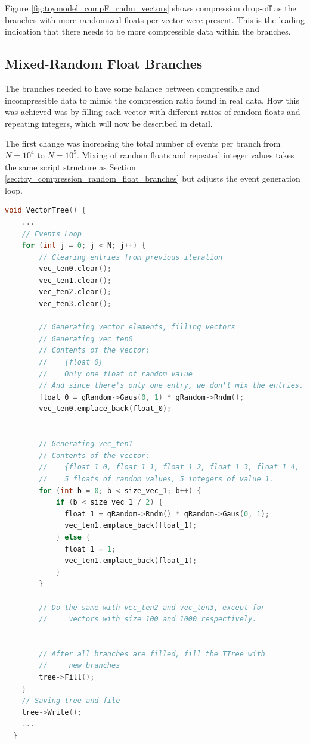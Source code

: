 Figure \ref{fig:toymodel_compF_rndm_vectors} shows compression drop-off as the branches with more randomized floats per vector were present.
This is the leading indication that there needs to be more compressible data within the branches. 

\subsection{Mixed-Random Float Branches}
The branches needed to have some balance between compressible and incompressible data to mimic the compression ratio found in real data.
How this was achieved was by filling each vector with different ratios of random floats and repeating integers, which will now be described in detail.

The first change was increasing the total number of events per branch from $N = 10^4$ to $N = 10^5$. 
Mixing of random floats and repeated integer values takes the same script structure as Section \ref{sec:toy_compression_random_float_branches} but adjusts the event generation loop.
\begin{lstlisting}[language=C]  
  void VectorTree() {
    ...
    // Events Loop
    for (int j = 0; j < N; j++) {
        // Clearing entries from previous iteration
        vec_ten0.clear();
        vec_ten1.clear();
        vec_ten2.clear();
        vec_ten3.clear();

        // Generating vector elements, filling vectors
        // Generating vec_ten0
        // Contents of the vector:
        //    {float_0}
        //    Only one float of random value
        // And since there's only one entry, we don't mix the entries. 
        float_0 = gRandom->Gaus(0, 1) * gRandom->Rndm();
        vec_ten0.emplace_back(float_0);
        

        // Generating vec_ten1
        // Contents of the vector:
        //    {float_1_0, float_1_1, float_1_2, float_1_3, float_1_4, 1, 1, 1, 1, 1}
        //    5 floats of random values, 5 integers of value 1.
        for (int b = 0; b < size_vec_1; b++) {
            if (b < size_vec_1 / 2) {
              float_1 = gRandom->Rndm() * gRandom->Gaus(0, 1);
              vec_ten1.emplace_back(float_1);
            } else {
              float_1 = 1;
              vec_ten1.emplace_back(float_1);
            }
        }

        // Do the same with vec_ten2 and vec_ten3, except for 
        //     vectors with size 100 and 1000 respectively. 


        // After all branches are filled, fill the TTree with 
        //     new branches
        tree->Fill(); 
    }
    // Saving tree and file
    tree->Write();
    ...
  }
\end{lstlisting}

